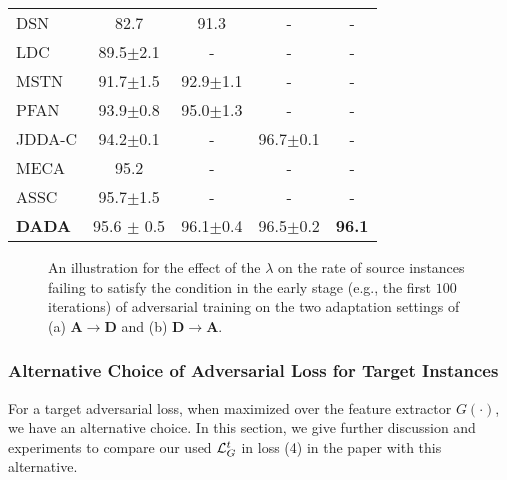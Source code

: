 \documentclass[letterpaper]{article} \usepackage{aaai20}  \usepackage{times}  \usepackage{helvet} \usepackage{courier}  \usepackage[hyphens]{url}  \usepackage{graphicx} \urlstyle{rm} \def\UrlFont{\rm}  \usepackage{graphicx}  \frenchspacing  \setlength{\pdfpagewidth}{8.5in}  \setlength{\pdfpageheight}{11in}
\begin{document}
\begin{table*}
\begin{center}
\begin{tabular}{lcccc}
			DSN \cite{dsn}         & 82.7 & 91.3 & - & - \\ 

			LDC \cite{layerWiseCorrection} & 89.5$\pm$2.1 & - & - & - \\ 

			MSTN \cite{mstn}        & 91.7$\pm$1.5 & 92.9$\pm$1.1 & - & - \\ 

			PFAN \cite{pfan}        & 93.9$\pm$0.8 & 95.0$\pm$1.3 & - & - \\ 

			JDDA-C \cite{jdda}      & 94.2$\pm$0.1 & - & 96.7$\pm$0.1 & - \\

			MECA \cite{meca}        & 95.2 & - & - & - \\
			
			ASSC \cite{associativeDA}        & 95.7$\pm$1.5 & - & - & - \\ 

			\hline
			\textbf{DADA}           & 95.6 $\pm$ 0.5 & 96.1$\pm$0.4 & 96.5$\pm$0.2 & \textbf{96.1} \\
			\hline
		\end{tabular} 
	\end{center}
\end{table*} 


\begin{figure}[t]
	\begin{center} 


	\end{center}
	\caption{An illustration for the effect of the $\lambda$ on the rate of source instances failing to satisfy the condition in the early stage (e.g., the first $100$ iterations) of adversarial training on the two adaptation settings of (a) \textbf{A}$\rightarrow$\textbf{D} and (b) \textbf{D}$\rightarrow$\textbf{A}.}
	\label{fig:verify_lambda}
\end{figure}

\subsubsection{Alternative Choice of Adversarial Loss for Target Instances}
\label{sec7}
For a target adversarial loss, when maximized over the feature extractor $G(\cdot)$, we have an alternative choice. In this section, we give further discussion and experiments to compare our used ${\cal{L}}_G^t$ in loss (4) in the paper with this alternative. 
\end{document}
